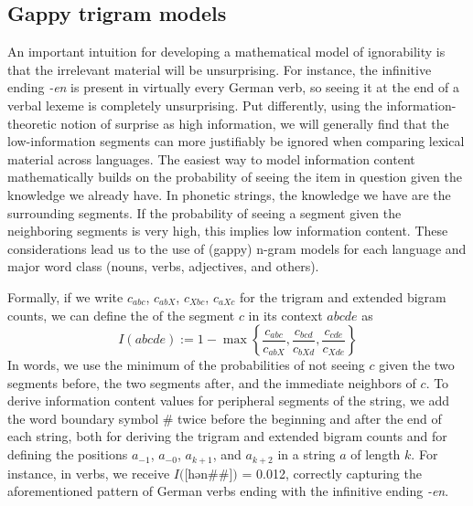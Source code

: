 \subsection{Gappy trigram models}\label{sec:4.3.2}
An important intuition for developing a mathematical model of ignorability is that the irrelevant material will be unsurprising. For instance, the infinitive ending \textit{-en} is present in virtually every German verb, so seeing it at the end of a verbal lexeme is completely unsurprising. Put differently, using the information-theoretic notion of surprise as high information, we will generally find that the low-information segments can more justifiably be ignored when comparing lexical material across languages. The easiest way to model information content mathematically builds on the probability of seeing the item in question given the knowledge we already have. In phonetic strings, the knowledge we have are the surrounding segments. If the probability of seeing a segment given the neighboring segments is very high, this implies low information content. These considerations lead us to the use of (gappy) n-gram models for each language and major word class (nouns, verbs, adjectives, and others).

Formally, if we write $c_{abc}$, $c_{abX}$, $c_{Xbc}$, $c_{aXc}$ for the trigram and extended bigram counts, we can define the \textit{} of the segment $c$ in its context $abcde$ as
\begin{equation*}
I(abcde) := 1 - \max\left \{\frac{c_{abc}}{c_{abX}}, \frac{c_{bcd}}{c_{bXd}}, \frac{c_{cde}}{c_{Xde}} \right \}
\end{equation*}
In words, we use the minimum of the probabilities of not seeing $c$ given the two segments before, the two segments after, and the immediate neighbors of $c$. To derive information content values for peripheral segments of the string, we add the word boundary symbol $\#$ twice before the beginning and after the end of each string, both for deriving the trigram and extended bigram counts and for defining the positions $a_{-1}$, $a_{-0}$, $a_{k+1}$, and $a_{k+2}$ in a string $a$ of length $k$. For instance, in  verbs, we receive $I($[hən\#\#]$)$ = 0.012, correctly capturing the aforementioned pattern of German verbs ending with the infinitive ending \textit{-en}.

